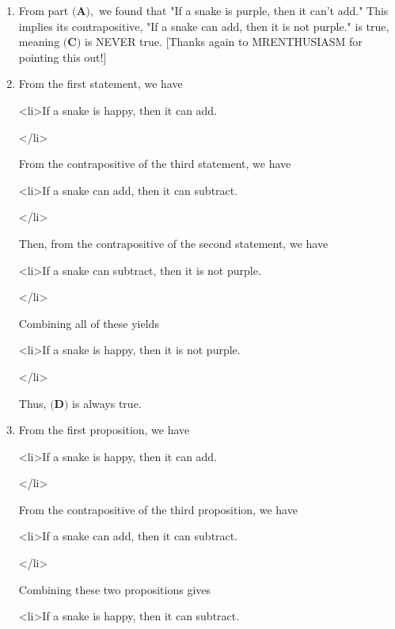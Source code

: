 \begin{enumerate}
\begin{enumerate}
\begin{itemize}
            \end{itemize}
            Thus, $\textbf{(B)}$ is never true.

        \item From part $\textbf{(A)},$ we found that "If a snake is purple, then it can't add." This implies its contrapositive, "If a snake can add, then it is not purple." is true, meaning $\textbf{(C)}$ is NEVER true. [Thanks again to MRENTHUSIASM for pointing this out!]

        \item From the first statement, we have 
            \begin{itemize}<li>If a snake is happy, then it can add.

 </li>
            \end{itemize}
            From the contrapositive of the third statement, we have
            \begin{itemize}<li>If a snake can add, then it can subtract. 

 </li>
            \end{itemize}
            Then, from the contrapositive of the second statement, we have 
            \begin{itemize}<li>If a snake can subtract, then it is not purple. 

 </li>
            \end{itemize}
            Combining all of these yields 
            \begin{itemize}<li>If a snake is happy, then it is not purple.

 </li>
            \end{itemize}
            Thus, $\textbf{(D)}$ is always true.

        \item From the first proposition, we have 
            \begin{itemize}<li>If a snake is happy, then it can add. 

 </li>
            \end{itemize}
            From the contrapositive of the third proposition, we have 
            \begin{itemize}<li>If a snake can add, then it can subtract. 

 </li>
            \end{itemize}
            Combining these two propositions gives 
            \begin{itemize}<li>If a snake is happy, then it can subtract. 


\end{itemize}
\end{enumerate}
\end{enumerate}
